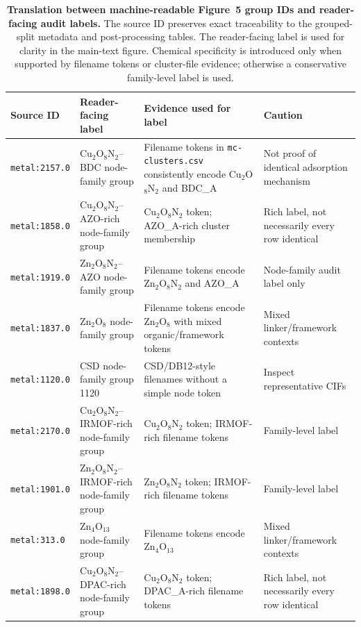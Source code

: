 \documentclass[11pt,a4paper]{article}
\begin{document}
\begin{table}[H]
\centering
\scriptsize
\caption{\textbf{Translation between machine-readable Figure~5 group IDs and reader-facing audit labels.}
The source ID preserves exact traceability to the grouped-split metadata and post-processing tables.
The reader-facing label is used for clarity in the main-text figure. Chemical specificity is introduced
only when supported by filename tokens or cluster-file evidence; otherwise a conservative family-level
label is used.}
\label{tab:si_label_translation}
\setlength{\tabcolsep}{4pt}
\begin{tabular}{p{}p{}p{}p{}}
\toprule
\textbf{Source ID} & \textbf{Reader-facing label} & \textbf{Evidence used for label} & \textbf{Caution} \\
\midrule
\texttt{metal:2157.0} & Cu$_2$O$_8$N$_2$--BDC node-family group & Filename tokens in \texttt{mc-clusters.csv} consistently encode Cu$_2$O$_8$N$_2$ and BDC\_A & Not proof of identical adsorption mechanism \\
\texttt{metal:1858.0} & Cu$_2$O$_8$N$_2$--AZO-rich node-family group & Cu$_2$O$_8$N$_2$ token; AZO\_A-rich cluster membership & Rich label, not necessarily every row identical \\
\texttt{metal:1919.0} & Zn$_2$O$_8$N$_2$--AZO node-family group & Filename tokens encode Zn$_2$O$_8$N$_2$ and AZO\_A & Node-family audit label only \\
\texttt{metal:1837.0} & Zn$_2$O$_8$ node-family group & Filename tokens encode Zn$_2$O$_8$ with mixed organic/framework tokens & Mixed linker/framework contexts \\
\texttt{metal:1120.0} & CSD node-family group 1120 & CSD/DB12-style filenames without a simple node token & Inspect representative CIFs \\
\texttt{metal:2170.0} & Cu$_2$O$_8$N$_2$--IRMOF-rich node-family group & Cu$_2$O$_8$N$_2$ token; IRMOF-rich filename tokens & Family-level label \\
\texttt{metal:1901.0} & Zn$_2$O$_8$N$_2$--IRMOF-rich node-family group & Zn$_2$O$_8$N$_2$ token; IRMOF-rich filename tokens & Family-level label \\
\texttt{metal:313.0} & Zn$_4$O$_{13}$ node-family group & Filename tokens encode Zn$_4$O$_{13}$ & Mixed linker/framework contexts \\
\texttt{metal:1898.0} & Cu$_2$O$_8$N$_2$--DPAC-rich node-family group & Cu$_2$O$_8$N$_2$ token; DPAC\_A-rich filename tokens & Rich label, not necessarily every row identical \\

\end{tabular}
\end{table}
\end{document}
